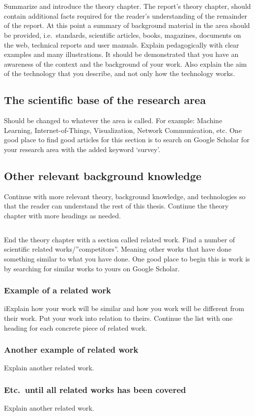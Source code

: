 \section{}\label{sec:theory} 
Summarize and introduce the theory chapter. The report's theory chapter, should
contain additional facts required for the reader's understanding of the
remainder of the report. At this point a summary of background material in the
area should be provided, i.e.\ standards, scientific articles, books, magazines,
documents on the web, technical reports and user manuals. Explain pedagogically
with clear examples and many illustrations. It should be demonstrated that you
have an awareness of the context and the background of your work. Also explain
the aim of the technology that you describe, and not only how the technology
works.

\subsection{The scientific base of the research area}\label{subsec:sciencebase}
Should be changed to whatever the area is called. For example: Machine Learning,
Internet-of-Things, Visualization, Network Communication, etc. One good place to
find good articles for this section is to search on Google Scholar for your
research area with the added keyword ‘survey’.

\subsection{Other relevant background knowledge}\label{subsec:other}
Continue with more relevant theory, background knowledge, and technologies so
that the reader can understand the rest of this thesis.  Continue the theory
chapter with more headings as needed.

\subsection{}\label{subsec:relatedwork} 
End the theory chapter with a section called related work. Find a number of
scientific related works/”competitors”. Meaning other works that have done
something similar to what you have done. One good place to begin this is work is
by searching for similar works to yours on Google Scholar.

\subsubsection{Example of a related work}\label{subsubsec:examplerelatedwork}
iExplain how your work will be similar and how you work will be different from
their work. Put your work into relation to theirs.  Continue the list with one
heading for each concrete piece of related work.

\subsubsection{Another example of related work}\label{subsubsec:anotherexample}
Explain another related work.

\subsubsection{Etc.\ until all related works has been covered}\label{subsubsec:etc}
Explain another related work.
